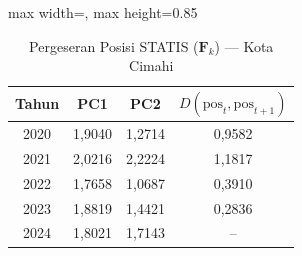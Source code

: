 \begin{table}[H]
\centering
\caption{Pergeseran Posisi STATIS ($\mathbf{F}_k$) --- Kota Cimahi} \label{tab:app1jarak_statis_skor_kota_cimahi}
\begin{adjustbox}{max width=\textwidth, max height=0.85\textheight}
\begin{tabular}{|c|c|c|c|}
\hline
\textbf{Tahun} & \textbf{PC1} & \textbf{PC2} & \textbf{$D(\text{pos}_t, \text{pos}_{t+1})$} \\
\hline
2020 & 1,9040 & 1,2714 & 0,9582 \\
2021 & 2,0216 & 2,2224 & 1,1817 \\
2022 & 1,7658 & 1,0687 & 0,3910 \\
2023 & 1,8819 & 1,4421 & 0,2836 \\
2024 & 1,8021 & 1,7143 & -- \\
\hline
\end{tabular}
\end{adjustbox}
\end{table}